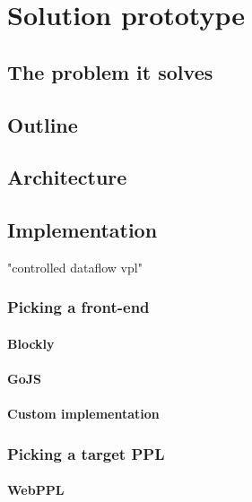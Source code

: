 \chapter{Solution prototype}\label{chap:chap3}


\section{The problem it solves}


\section{Outline}

\section{Architecture}

\section{Implementation}

 "controlled dataflow vpl"

\subsection{Picking a front-end}

\subsubsection{Blockly}

\subsubsection{GoJS}

\subsubsection{Custom implementation}

\subsection{Picking a target PPL}

\subsubsection{WebPPL}

